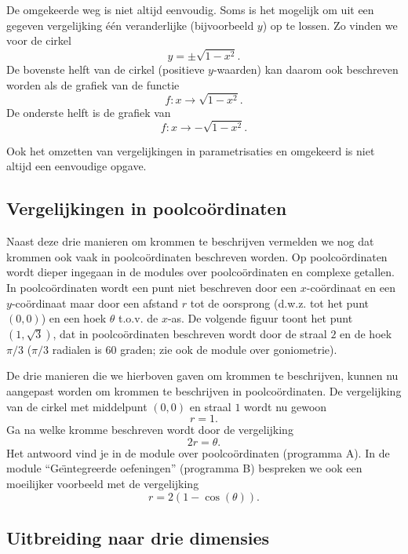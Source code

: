 De omgekeerde weg is niet altijd eenvoudig. Soms is het mogelijk om
uit een gegeven vergelijking \'e\'en veranderlijke (bijvoorbeeld $y$)
op te lossen. Zo vinden we voor de cirkel
\[
y=\pm\sqrt{1-x^2}.
\]
De bovenste helft van de cirkel (positieve $y$-waarden) kan daarom ook
beschreven worden als de grafiek van de functie
\[
f:x\rightarrow \sqrt{1-x^2}.
\]
De onderste helft is de grafiek van
\[
f:x\rightarrow -\sqrt{1-x^2}.
\]

Ook het omzetten van vergelijkingen in parametrisaties en omgekeerd is
niet altijd een eenvoudige opgave.

\subsection{Vergelijkingen in poolco\"ordinaten}

Naast deze drie manieren om krommen te beschrijven vermelden we nog
dat krommen ook vaak in poolco\"ordinaten beschreven worden.  Op
poolco\"ordinaten wordt dieper ingegaan in de modules over
poolco\"ordinaten en complexe getallen. In poolco\"ordinaten wordt een
punt niet beschreven door een $x$-co\"ordinaat en een $y$-co\"ordinaat
maar door een afstand $r$ tot de oorsprong (d.w.z. tot het punt
$(0,0)$) en een hoek $\theta$ t.o.v. de $x$-as. De volgende figuur
toont het punt $(1,\sqrt{3})$, dat in poolco\"ordinaten beschreven
wordt door de straal $2$ en de hoek $\pi/3$ ($\pi/3$ radialen is $60$
graden; zie ook de module over goniometrie).



De drie manieren die we hierboven gaven om krommen te beschrijven,
kunnen nu aangepast worden om krommen te beschrijven in
poolco\"ordinaten. De vergelijking van de cirkel met middelpunt
$(0,0)$ en straal $1$ wordt nu gewoon
\[
r=1.
\]
Ga na welke kromme beschreven wordt door de vergelijking
\[
2r=\theta.
\]
Het antwoord vind je in de module over poolco\"ordinaten
(programma A). In de module ``Ge\"\i ntegreerde oefeningen''
(programma B) bespreken we ook een moeilijker voorbeeld met de vergelijking
\[
r=2(1-\cos(\theta)).
\]

\subsection{Uitbreiding naar drie dimensies}

